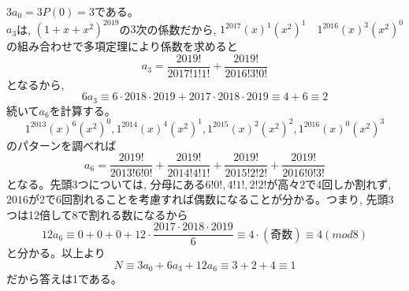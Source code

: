 $3a_0=3P(0)=3$である。\\
$a_3$は, $(1+x+x^2)^{2019}$の$3$次の係数だから, $1^{2017}(x)^1(x^2)^1$　$1^{2016}(x)^3(x^2)^0$の組み合わせで多項定理により係数を求めると
\[a_3=\dfrac{2019!}{2017!1!1!}+\dfrac{2019!}{2016!3!0!}\]
となるから,
\[6a_3\equiv 6\cdot 2018\cdot 2019 + 2017\cdot 2018\cdot 2019 \equiv 4+6\equiv 2 \]
続いて$a_6$を計算する。
\[ 1^{2013}(x)^6(x^2)^0, 1^{2014}(x)^4(x^2)^1, 1^{2015}(x)^2(x^2)^2, 1^{2016}(x)^0(x^2)^3 \]
のパターンを調べれば
\[a_6=\dfrac{2019!}{2013!6!0!}+\dfrac{2019!}{2014!4!1!}+\dfrac{2019!}{2015!2!2!}+\dfrac{2019!}{2016!0!3!}\]
となる。先頭3つについては, 分母にある$6!0!, 4!1!, 2!2!$が高々2で4回しか割れず, $2016$が2で6回割れることを考慮すれば偶数になることが分かる。つまり, 先頭3つは12倍して8で割れる数になるから
\[12a_6\equiv 0+0+0+12\cdot\dfrac{2017\cdot 2018\cdot 2019}{6}\equiv 4\cdot (奇数)\equiv 4　(mod 8)\]
と分かる。以上より
\[N\equiv 3a_0+6a_3+12a_6\equiv 3+2+4\equiv 1\]
だから答えは1である。
